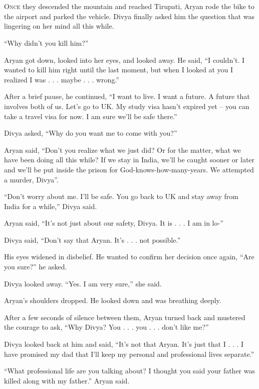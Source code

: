 \chapter{}

\lettrine{O}{nce} they descended the mountain and reached Tirupati, Aryan rode the bike to
the airport and parked the vehicle. Divya finally asked him the question that
was lingering on her mind all this while.

“Why didn't you kill him?”

Aryan got down, looked into her eyes, and looked away. He said, “I couldn't. I
wanted to kill him right until the last moment, but when I looked at you I
realized I was . . . maybe . . . wrong.”

After a brief pause, he continued, “I want to live. I want a future. A future
that involves both of us. Let's go to UK. My study visa hasn't expired yet – you
can take a travel visa for now. I am sure we'll be safe there.”

Divya asked, “Why do you want me to come with you?”

Aryan said, “Don't you realize what we just did? Or for the matter, what we have
been doing all this while? If we stay in India, we'll be caught sooner or later
and we'll be put inside the prison for God-knows-how-many-years. We attempted a
murder, Divya”.

“Don't worry about me. I'll be safe. You go back to UK and stay away from India
for a while,” Divya said.

Aryan said, “It's not just about our safety, Divya. It is . . . I am in lo-”

Divya said, “Don't say that Aryan. It's . . . not possible.”

His eyes widened in disbelief. He wanted to confirm her decision once again,
“Are you sure?” he asked.

Divya looked away. “Yes. I am very sure,” she said.

Aryan's shoulders dropped. He looked down and was breathing deeply.

After a few seconds of silence between them, Aryan turned back and mustered the
courage to ask, “Why Divya? You . . . you . . . don't like me?”

Divya looked back at him and said, “It's not that Aryan. It's just that I . . .
I have promised my dad that I'll keep my personal and professional lives
separate.”

“What professional life are you talking about? I thought you said your father
was killed along with my father.” Aryan said.

